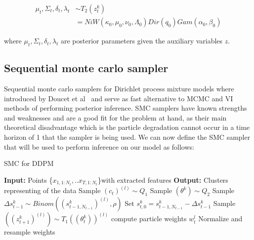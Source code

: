 \documentclass[twoside,hidelinks]{article}
\begin{document}
\begin{equation}
\begin{split}
\mu_t, \Sigma_t, \delta_t,  \lambda_t & \sim T_2(z_t^k)\\
 & = NiW( \kappa_0, \mu_0, \nu_0, \Lambda_0 ) Dir(q_0) Gam(\alpha_0, \beta_0) 
\end{split}
\end{equation}

where $\mu_t, \Sigma_t, \delta_t,  \lambda_t$  are posterior parameters given the auxiliary variables $z$.

\subsection{Sequential monte carlo sampler}

Sequential monte carlo samplers for Dirichlet process mixture models where introduced by Doucet et al~\cite{doucet} and serve as fast alternative to MCMC and VI methods of performing posterior inference. SMC samplers have known strengths and weaknesses and are a good fit for the problem at hand, as their main theoretical disadvantage which is the particle degradation cannot occur in a time horizon of 1 that the sampler is being used. We can now define the SMC sampler that will be used to perform inference on our model as follows:

\begin{algorithm}[h]
  \caption{SMC for DDPM}\label{SMC}
  \begin{algorithmic}[1]
	\State \textbf{Input:} Points \{$x_{1,1:N_t}, ..x_{T,1:N_t}$\}with extracted features
	\State \textbf{Output:} Clusters representing of the data
								\State Sample $(c_t)^{(l)} \sim Q_1$  
								\State Sample $(\theta^k ) \sim Q_2$
						    \EndFor		
		    \EndFor
			   \State Sample $\Delta s_{t-1}^k \sim Binom( (s_{t-1,N_{t-1}}^k)^{(l)}, \rho) $ 
		       \State Set $s_{t,0}^{k} = s_{t-1,N_{t-1}}^{k} -\Delta s_{t-1}^k$
   		       \State Sample $( (z_{t+1}^k)^{(l)} ) \sim T_1((\theta_t^k))^{(l)} $
		    \EndFor
		 	\State compute particle weights $w_t^l$
    \EndFor
    \State Normalize and resample weights
  \end{algorithmic}
\end{algorithm}
\end{document}
